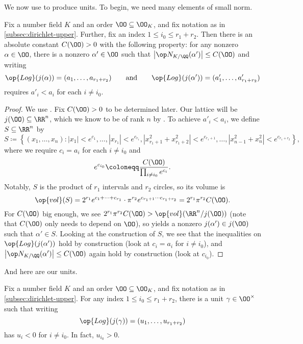 \documentclass[../notes.tex]{subfiles}
\begin{document}
We now use  to produce units. To begin, we need many elements of small norm.
\begin{lemma} \label{lem:decrease-coords-bound-norm}
	Fix a number field $K$ and an order $\OO\subseteq\OO_K$, and fix notation as in \cref{subsec:dirichlet-upper}. Further, fix an index $1\le i_0\le r_1+r_2$. Then there is an absolute constant $C(\OO)>0$ with the following property: for any nonzero $\alpha\in\OO$, there is a nonzero $\alpha'\in\OO$ such that $\left|\op N_{K/\QQ}(\alpha')\right|\le C(\OO)$ and writing
	\[\op{Log}(j(\alpha))=(a_1,\ldots,a_{r_1+r_2})\qquad\text{and}\qquad\op{Log}(j(\alpha'))=(a'_1,\ldots,a'_{r_1+r_2})\]
	requires $a'_i<a_i$ for each $i\ne i_0$.
\end{lemma}
\begin{proof}
	We use . Fix $C(\OO)>0$ to be determined later. Our lattice will be $j(\OO)\subseteq\RR^n$, which we know to be of rank $n$ by . To achieve $a'_i<a_i$, we define $S\subseteq\RR^n$ by
	\[S\coloneqq\left\{(x_1,\ldots,x_n):\left|x_1\right|<e^{c_1},\ldots,\left|x_{r_1}\right|<e^{c_{r_1}},\left|x_{r_1+1}^2+x_{r_1+2}^2\right|<e^{c_{r_1+1}},\ldots,\left|x_{n-1}^2+x_n^2\right|<e^{c_{r_1+r_2}}\right\},\]
	where we require $c_i=a_i$ for each $i\ne i_0$ and
	\[e^{c_{i_0}}\coloneqq\frac{C(\OO)}{\prod_{i\ne i_0}e^{c_i}}.\]
	Notably, $S$ is the product of $r_1$ intervals and $r_2$ circles, so its volume is
	\[\op{vol}(S)=2^{r_1}e^{c_1+\cdots+c_{r_1}}\cdot\pi^{r_2}e^{c_{r_1+1}\cdots c_{r_1+r_2}}=2^{r_1}\pi^{r_2}C(\OO).\]
	For $C(\OO)$ big enough, we see $2^{r_1}\pi^{r_2}C(\OO)>\op{vol}(\RR^n/j(\OO))$ (note that $C(\OO)$ only needs to depend on $\OO$), so  yields a nonzero $j(\alpha')\in j(\OO)$ such that $\alpha'\in S$. Looking at the construction of $S$, we see that the inequalities on $\op{Log}(j(\alpha'))$ hold by construction (look at $c_i=a_i$ for $i\ne i_0$), and $\left|\op N_{K/\QQ}(\alpha')\right|\le C(\OO)$ again hold by construction (look at $c_{i_0}$).
\end{proof}
And here are our units.
\begin{lemma} \label{lem:special-negative-unit}
	Fix a number field $K$ and an order $\OO\subseteq\OO_K$, and fix notation as in \cref{subsec:dirichlet-upper}. For any index $1\le i_0\le r_1+r_2$, there is a unit $\gamma\in\OO^\times$ such that writing
	\[\op{Log}(j(\gamma))=(u_1,\ldots,u_{r_1+r_2})\]
	has $u_i<0$ for $i\ne i_0$. In fact, $u_{i_0}>0$.
\end{lemma}
\end{document}
